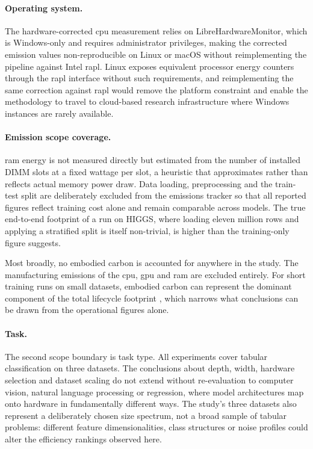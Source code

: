 \paragraph{Operating system.}
The hardware-corrected \gls{cpu} measurement relies on LibreHardwareMonitor, which is Windows-only and requires administrator privileges, making the corrected emission values non-reproducible on Linux or macOS without reimplementing the pipeline against Intel \gls{rapl}. Linux exposes equivalent processor energy counters through the \gls{rapl} interface without such requirements, and reimplementing the same correction against \gls{rapl} would remove the platform constraint and enable the methodology to travel to cloud-based research infrastructure where Windows instances are rarely available.

\paragraph{Emission scope coverage.}
\gls{ram} energy is not measured directly but estimated from the number of installed DIMM slots at a fixed wattage per slot, a heuristic that approximates rather than reflects actual memory power draw. Data loading, preprocessing and the train-test split are deliberately excluded from the emissions tracker so that all reported figures reflect training cost alone and remain comparable across models. The true end-to-end footprint of a run on HIGGS, where loading eleven million rows and applying a stratified split is itself non-trivial, is higher than the training-only figure suggests.

Most broadly, no embodied carbon is accounted for anywhere in the study. The manufacturing emissions of the \gls{cpu}, \gls{gpu} and \gls{ram} are excluded entirely. For short training runs on small datasets, embodied carbon can represent the dominant component of the total lifecycle footprint \parencite{eilamMethodologyFrameworkAI2023,wuSustainableAIEnvironmental2022}, which narrows what conclusions can be drawn from the operational figures alone.

\paragraph{Task.}
The second scope boundary is task type. All experiments cover tabular classification on three datasets. The conclusions about depth, width, hardware selection and dataset scaling do not extend without re-evaluation to computer vision, natural language processing or regression, where model architectures map onto hardware in fundamentally different ways. The study's three datasets also represent a deliberately chosen size spectrum, not a broad sample of tabular problems: different feature dimensionalities, class structures or noise profiles could alter the efficiency rankings observed here.

